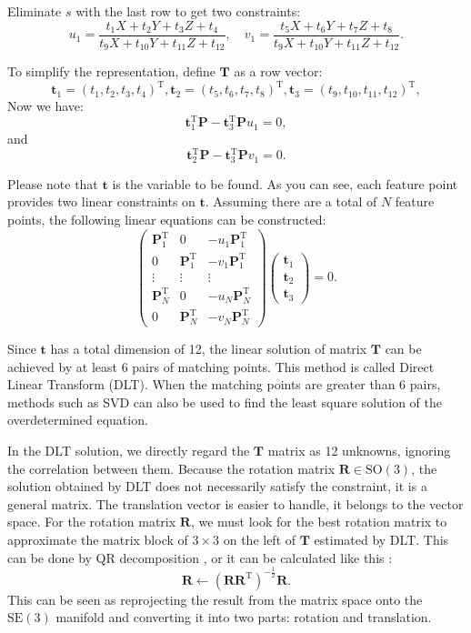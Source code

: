 Eliminate $s$ with the last row to get two constraints:
\[
u_{1}=\frac{t_{1}X+t_{2}Y+t_{3}Z+t_{4}}{t_{9}X+t_{10}Y+t_{11}Z+t_{12}},\quad
v_{1}=\frac{t_{5}X+t_{6}Y+t_{7}Z+t_{8}}{t_{9}X+t_{10}Y+t_{11}Z+t_{12}}.
\]

To simplify the representation, define $\bm{T}$ as a row vector:
\[
\bm{t}_{1}=(t_{1},t_{2},t_{3},t_{4})^\mathrm{T},
\bm{t}_{2}=(t_{5},t_{6},t_{7},t_{8})^\mathrm{T},
\bm{t}_{3}=(t_{9},t_{10},t_{11},t_{12})^\mathrm{T},
\]
Now we have:
\[
\bm{t}_1^\mathrm{T}\bm{P}-\bm{t}_3^\mathrm{T}\bm{P} u_1=0,
\]
and
\[
\bm{t}_2^\mathrm{T}\bm{P}-\bm{t}_3^\mathrm{T}\bm{P} v_1=0.
\]

Please note that $\bm{t}$ is the variable to be found. As you can see, each feature point provides two linear constraints on $\bm{t}$. Assuming there are a total of $N$ feature points, the following linear equations can be constructed:
\begin{equation}
\begin{pmatrix}
\bm{P}_{1}^{\mathrm{T}} & 0 & -u_{1}\bm{P}_{1}^{\mathrm{T}}	\\
0 & \bm{P}_{1}^{\mathrm{T}} & -v_{1}\bm{P}_{1}^{\mathrm{T}}	\\
\vdots & \vdots & \vdots			\\
\bm{P}_{N}^{\mathrm{T}} & 0 & -u_{N}\bm{P}_{N}^{\mathrm{T}} \\
0 & \bm{P}_{N}^{\mathrm{T}} & -v_{N}\bm{P}_{N}^{\mathrm{T}}
\end{pmatrix}
\begin{pmatrix}
\bm{t}_{1} \\ \bm{t}_{2} \\ \bm{t}_{3}
\end{pmatrix}
=0.
\end{equation}

Since $\bm{t}$ has a total dimension of 12, the linear solution of matrix $\bm{T}$ can be achieved by at least 6 pairs of matching points. This method is called Direct Linear Transform (DLT). When the matching points are greater than 6 pairs, methods such as SVD can also be used to find the least square solution of the overdetermined equation.

In the DLT solution, we directly regard the $\bm{T}$ matrix as 12 unknowns, ignoring the correlation between them. Because the rotation matrix $\bm{R} \in \mathrm{SO}(3)$, the solution obtained by DLT does not necessarily satisfy the constraint, it is a general matrix. The translation vector is easier to handle, it belongs to the vector space. For the rotation matrix $\bm{R}$, we must look for the best rotation matrix to approximate the matrix block of $3 \times 3$ on the left of $\bm{T}$ estimated by DLT. This can be done by QR decomposition \textsuperscript{\cite{Hartley2003, Chen1994}}, or it can be calculated like this \textsuperscript{\cite{Barfoot2016,Green1952}}:
\begin{equation}
\bm{R} \leftarrow {\left( {\bm{R}{\bm{R}^\mathrm{T}}} \right)^{ - \frac{1}{2}}} \bm{R}.
\end{equation}
This can be seen as reprojecting the result from the matrix space onto the $\mathrm{SE}(3)$ manifold and converting it into two parts: rotation and translation.

